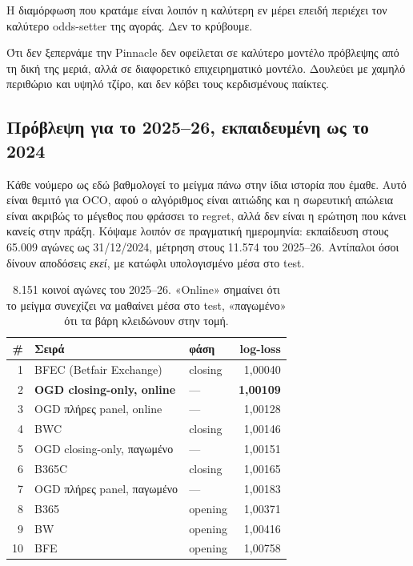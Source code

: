 \documentclass[11pt,a4paper]{article}
\renewcommand{\_}{\oldunderscore\allowbreak}
\begin{document}
Η διαμόρφωση που κρατάμε είναι λοιπόν η καλύτερη εν μέρει επειδή περιέχει τον καλύτερο
odds-setter της αγοράς. Δεν το κρύβουμε.

Ότι δεν ξεπερνάμε την Pinnacle δεν οφείλεται σε καλύτερο μοντέλο πρόβλεψης από τη δική της
μεριά, αλλά σε διαφορετικό επιχειρηματικό μοντέλο. Δουλεύει με χαμηλό περιθώριο και υψηλό
τζίρο, και δεν κόβει τους κερδισμένους παίκτες.

\subsection*{Πρόβλεψη για το 2025--26, εκπαιδευμένη ως το 2024}

Κάθε νούμερο ως εδώ βαθμολογεί το μείγμα πάνω στην ίδια ιστορία που έμαθε. Αυτό είναι θεμιτό
για OCO, αφού ο αλγόριθμος είναι αιτιώδης και η σωρευτική απώλεια είναι ακριβώς το μέγεθος
που φράσσει το regret, αλλά δεν είναι η ερώτηση που κάνει κανείς στην πράξη. Κόψαμε λοιπόν
σε πραγματική ημερομηνία: εκπαίδευση στους 65.009 αγώνες ως 31/12/2024, μέτρηση στους
11.574 του 2025--26. Αντίπαλοι όσοι δίνουν αποδόσεις \emph{εκεί}, με κατώφλι υπολογισμένο
μέσα στο test.

\begin{table}[H]
\centering
\small
\begin{tabular}{@{}rllr@{}}
\toprule
\textbf{\#} & \textbf{Σειρά} & \textbf{φάση} & \textbf{log-loss} \\
\midrule
1 & BFEC (Betfair Exchange) & closing & 1,00040 \\
2 & \textbf{OGD closing-only, online} & --- & \textbf{1,00109} \\
3 & OGD πλήρες panel, online & --- & 1,00128 \\
4 & BWC & closing & 1,00146 \\
5 & OGD closing-only, παγωμένο & --- & 1,00151 \\
6 & B365C & closing & 1,00165 \\
7 & OGD πλήρες panel, παγωμένο & --- & 1,00183 \\
8 & B365 & opening & 1,00371 \\
9 & BW & opening & 1,00416 \\
10 & BFE & opening & 1,00758 \\
\bottomrule
\end{tabular}
\caption{8.151 κοινοί αγώνες του 2025--26. «Online» σημαίνει ότι το μείγμα συνεχίζει να
μαθαίνει μέσα στο test, «παγωμένο» ότι τα βάρη κλειδώνουν στην τομή.}
\end{table}
\end{document}
